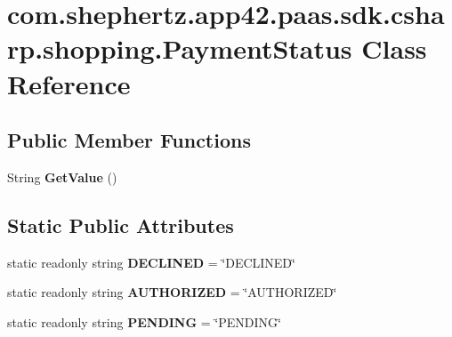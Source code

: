\hypertarget{classcom_1_1shephertz_1_1app42_1_1paas_1_1sdk_1_1csharp_1_1shopping_1_1_payment_status}{\section{com.\+shephertz.\+app42.\+paas.\+sdk.\+csharp.\+shopping.\+Payment\+Status Class Reference}
\label{classcom_1_1shephertz_1_1app42_1_1paas_1_1sdk_1_1csharp_1_1shopping_1_1_payment_status}
}
\subsection*{Public Member Functions}
\begin{DoxyCompactItemize}
\item 
\hypertarget{classcom_1_1shephertz_1_1app42_1_1paas_1_1sdk_1_1csharp_1_1shopping_1_1_payment_status_a238cd49e679fd31fd877d27267ae3c97}{String {\bfseries Get\+Value} ()}\label{classcom_1_1shephertz_1_1app42_1_1paas_1_1sdk_1_1csharp_1_1shopping_1_1_payment_status_a238cd49e679fd31fd877d27267ae3c97}

\end{DoxyCompactItemize}
\subsection*{Static Public Attributes}
\begin{DoxyCompactItemize}
\item 
\hypertarget{classcom_1_1shephertz_1_1app42_1_1paas_1_1sdk_1_1csharp_1_1shopping_1_1_payment_status_a1b2375b5d36336195692ef3cc41bd0af}{static readonly string {\bfseries D\+E\+C\+L\+I\+N\+E\+D} = \char`\"{}D\+E\+C\+L\+I\+N\+E\+D\char`\"{}}\label{classcom_1_1shephertz_1_1app42_1_1paas_1_1sdk_1_1csharp_1_1shopping_1_1_payment_status_a1b2375b5d36336195692ef3cc41bd0af}

\item 
\hypertarget{classcom_1_1shephertz_1_1app42_1_1paas_1_1sdk_1_1csharp_1_1shopping_1_1_payment_status_a86f6174c47c13871da72be5af7916dfe}{static readonly string {\bfseries A\+U\+T\+H\+O\+R\+I\+Z\+E\+D} = \char`\"{}A\+U\+T\+H\+O\+R\+I\+Z\+E\+D\char`\"{}}\label{classcom_1_1shephertz_1_1app42_1_1paas_1_1sdk_1_1csharp_1_1shopping_1_1_payment_status_a86f6174c47c13871da72be5af7916dfe}

\item 
\hypertarget{classcom_1_1shephertz_1_1app42_1_1paas_1_1sdk_1_1csharp_1_1shopping_1_1_payment_status_af72a2a98ab2b52f8eb0b764e31bf3259}{static readonly string {\bfseries P\+E\+N\+D\+I\+N\+G} = \char`\"{}P\+E\+N\+D\+I\+N\+G\char`\"{}}\label{classcom_1_1shephertz_1_1app42_1_1paas_1_1sdk_1_1csharp_1_1shopping_1_1_payment_status_af72a2a98ab2b52f8eb0b764e31bf3259}

\end{DoxyCompactItemize}
